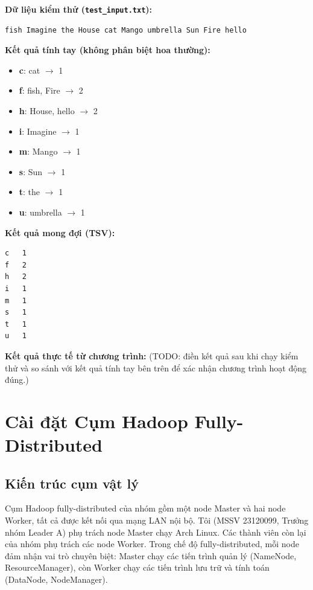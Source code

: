 \documentclass[12pt]{article}
\begin{document}
\textbf{Dữ liệu kiểm thử (\texttt{test\_input.txt}):}
\begin{verbatim}
fish Imagine the House cat Mango umbrella Sun Fire hello
\end{verbatim}

\textbf{Kết quả tính tay (không phân biệt hoa thường):}
\begin{itemize}
  \item \textbf{c}: cat $\rightarrow$ 1
  \item \textbf{f}: fish, Fire $\rightarrow$ 2
  \item \textbf{h}: House, hello $\rightarrow$ 2
  \item \textbf{i}: Imagine $\rightarrow$ 1
  \item \textbf{m}: Mango $\rightarrow$ 1
  \item \textbf{s}: Sun $\rightarrow$ 1
  \item \textbf{t}: the $\rightarrow$ 1
  \item \textbf{u}: umbrella $\rightarrow$ 1
\end{itemize}

\textbf{Kết quả mong đợi (TSV):}
\begin{verbatim}
c	1
f	2
h	2
i	1
m	1
s	1
t	1
u	1
\end{verbatim}

\textbf{Kết quả thực tế từ chương trình:} (TODO: điền kết quả sau khi chạy kiểm
thử và so sánh với kết quả tính tay bên trên để xác nhận chương trình hoạt động
đúng.)

\section{Cài đặt Cụm Hadoop Fully-Distributed}

\subsection{Kiến trúc cụm vật lý}

Cụm Hadoop fully-distributed của nhóm gồm một node Master và hai node Worker, tất
cả được kết nối qua mạng LAN nội bộ. Tôi (MSSV 23120099, Trưởng nhóm Leader A) phụ
trách node Master chạy Arch Linux. Các thành viên còn lại của nhóm phụ trách các
node Worker. Trong chế độ fully-distributed, mỗi node đảm nhận vai trò chuyên biệt:
Master chạy các tiến trình quản lý (NameNode, ResourceManager), còn Worker chạy các
tiến trình lưu trữ và tính toán (DataNode, NodeManager).
\end{document}
